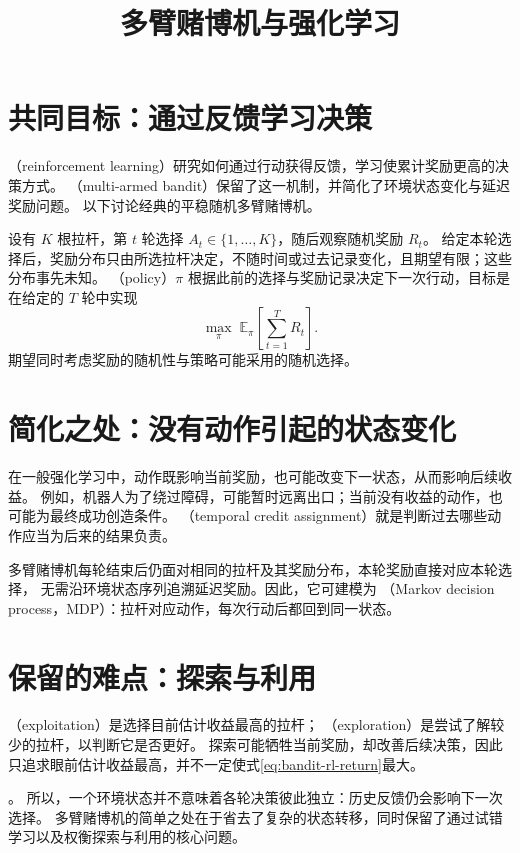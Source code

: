 \documentclass[UTF8]{ctexart}
\title{多臂赌博机与强化学习}
\author{}
\date{}
\begin{document}
\maketitle

\section{共同目标：通过反馈学习决策}
\label{sec:bandit-rl-objective}

（reinforcement learning）研究如何通过行动获得反馈，学习使累计奖励更高的决策方式。
（multi-armed bandit）保留了这一机制，并简化了环境状态变化与延迟奖励问题。
以下讨论经典的平稳随机多臂赌博机。

设有 $K$ 根拉杆，第 $t$ 轮选择 $A_t\in\{1,\ldots,K\}$，随后观察随机奖励 $R_t$。
给定本轮选择后，奖励分布只由所选拉杆决定，不随时间或过去记录变化，且期望有限；这些分布事先未知。
（policy）$\pi$ 根据此前的选择与奖励记录决定下一次行动，目标是在给定的 $T$ 轮中实现
\begin{equation}
  \max_{\pi}\;\mathbb{E}_{\pi}\!\left[\sum_{t=1}^{T}R_t\right].
  \label{eq:bandit-rl-return}
\end{equation}
期望同时考虑奖励的随机性与策略可能采用的随机选择。

\section{简化之处：没有动作引起的状态变化}
\label{sec:bandit-rl-simplification}

在一般强化学习中，动作既影响当前奖励，也可能改变下一状态，从而影响后续收益。
例如，机器人为了绕过障碍，可能暂时远离出口；当前没有收益的动作，也可能为最终成功创造条件。
（temporal credit assignment）就是判断过去哪些动作应当为后来的结果负责。

多臂赌博机每轮结束后仍面对相同的拉杆及其奖励分布，本轮奖励直接对应本轮选择，
无需沿环境状态序列追溯延迟奖励。因此，它可建模为
（Markov decision process，MDP）：拉杆对应动作，每次行动后都回到同一状态。

\section{保留的难点：探索与利用}
\label{sec:bandit-rl-exploration}

（exploitation）是选择目前估计收益最高的拉杆；
（exploration）是尝试了解较少的拉杆，以判断它是否更好。
探索可能牺牲当前奖励，却改善后续决策，因此只追求眼前估计收益最高，并不一定使式\eqref{eq:bandit-rl-return}最大。

。
所以，一个环境状态并不意味着各轮决策彼此独立：历史反馈仍会影响下一次选择。
多臂赌博机的简单之处在于省去了复杂的状态转移，同时保留了通过试错学习以及权衡探索与利用的核心问题。
\end{document}
